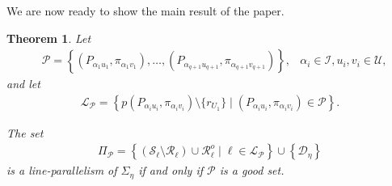 \documentclass[11pt]{article}
\newtheorem{theorem}{Theorem}[section]
\theoremstyle{definition}
\numberwithin{equation}{section}
\def\cI{\mathcal I}
\def\cL{\mathcal L}
\def\cP{\mathcal P}
\def\cD{\mathcal D}
\def\cU{\mathcal U}
\def\cR{\mathcal R}
\def\cS{\mathcal S}
\begin{document}
We are now ready to show the main result of the paper. 

\begin{theorem}\label{main}
Let 
\begin{align*}
& \cP = \left\{\left(P_{\alpha_{1} u_1}, \pi_{\alpha_{1} v_1}\right), \dots, \left(P_{\alpha_{{q+1}} u_{q+1}}, \pi_{\alpha_{{q+1}} v_{q+1}}\right)\right\}, & \alpha_{i} \in \cI, u_i, v_i \in \cU, 
\end{align*}
and let 
\begin{align*}
\cL_{\cP} = \left\{p\left(P_{\alpha_{i} u_i}, \pi_{\alpha_{i} v_i}\right) \setminus \{r_{U_1}\} \mid \left(P_{\alpha_{i} u_i}, \pi_{\alpha_{i} v_i}\right) \in \cP \right\}. 
\end{align*}

The set 
\begin{align*}
\Pi_{\cP} = \left\{ \left(\cS_\ell \setminus \cR_{\ell}\right) \cup {\cR_{\ell}^o} \mid \ell \in \cL_{\cP} \right\} \cup \left\{\cD_{\eta}\right\} 
\end{align*}
is a line-parallelism of $\Sigma_{\eta}$ if and only if $\cP$ is a good set.
\end{theorem}
\end{document}
